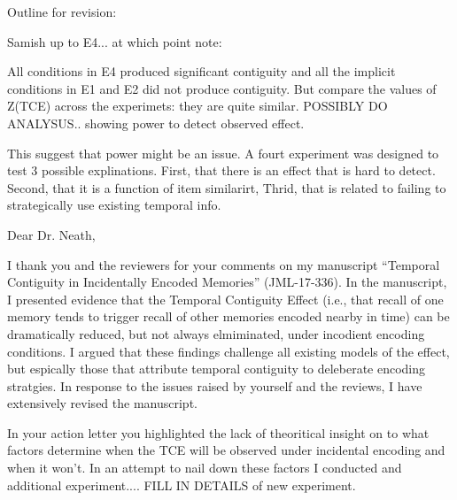 \documentclass[12pt]{article}
\begin{document}



Outline for revision:

Samish up to E4... at which point note:

All conditions in E4 produced significant contiguity and all the implicit conditions in E1 and E2 did not produce contiguity. But compare the values of Z(TCE) across the experimets: they are quite similar. POSSIBLY DO ANALYSUS.. showing power to detect observed effect.

This suggest that power might be an issue. A fourt experiment was designed to test 3 possible explinations. First, that there is an effect that is hard to detect. Second, that it is a function of item similarirt, Thrid, that is related to failing to strategically use existing temporal info.




Dear Dr. Neath,
 

I thank you and the reviewers for your comments on my manuscript  ``Temporal Contiguity in Incidentally Encoded Memories'' (JML-17-336). In the manuscript, I presented evidence that the Temporal Contiguity Effect (i.e., that recall of one memory tends to trigger recall of other memories encoded nearby in time) can be dramatically reduced, but not always elmiminated, under incodient encoding conditions. I argued that these findings challenge all existing models of the effect, but espically those that attribute temporal contiguity to deleberate encoding stratgies. In response to the issues raised by yourself and the reviews, I have extensively revised the manuscript. 


In your action letter you highlighted the lack of theoritical insight on to what factors determine when the TCE will be observed under incidental encoding and when it won't. In an attempt to nail down these factors I conducted and additional experiment.... FILL IN DETAILS of new experiment.
\end{document}
